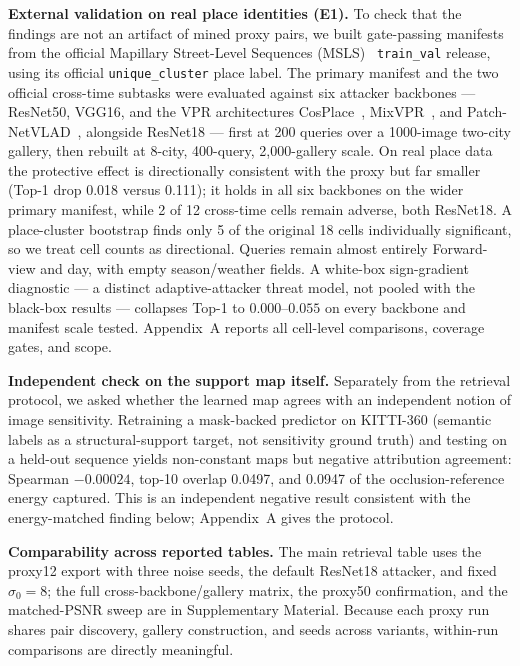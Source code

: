 \documentclass[10pt,journal]{IEEEtran}
\begin{document}
\textbf{External validation on real place identities (E1).} To check that the
findings are not an artifact of mined proxy pairs, we built gate-passing
manifests from the official Mapillary Street-Level Sequences
(MSLS)~\cite{mapillarymsls2020} \texttt{train\_val} release, using its
official \texttt{unique\_cluster} place label. The primary manifest and the
two official cross-time subtasks were evaluated against six attacker
backbones --- ResNet50, VGG16, and the VPR architectures
CosPlace~\cite{berton2022rethinking}, MixVPR~\cite{ali2023mixvpr}, and
Patch-NetVLAD~\cite{hausler2021patchnetvlad}, alongside ResNet18 --- first at
200 queries over a 1000-image two-city gallery, then rebuilt at 8-city,
400-query, 2,000-gallery scale. On real place data the protective effect is
directionally consistent with the proxy but far smaller (Top-1 drop 0.018
versus 0.111); it holds in all six backbones on the wider primary manifest,
while 2 of 12 cross-time cells remain adverse, both ResNet18. A place-cluster
bootstrap finds only 5 of the original 18 cells individually significant, so
we treat cell counts as directional. Queries remain almost entirely
Forward-view and day, with empty season/weather fields. A white-box
sign-gradient diagnostic --- a distinct adaptive-attacker threat model, not
pooled with the black-box results --- collapses Top-1 to $0.000$--$0.055$ on
every backbone and manifest scale tested. Appendix~A reports all cell-level
comparisons, coverage gates, and scope.

\textbf{Independent check on the support map itself.} Separately from the
retrieval protocol, we asked whether the learned map agrees with an
independent notion of image sensitivity. Retraining a mask-backed predictor on
KITTI-360 (semantic labels as a structural-support target, not sensitivity
ground truth) and testing on a held-out sequence yields non-constant maps but
negative attribution agreement: Spearman $-0.00024$, top-10 overlap 0.0497,
and 0.0947 of the occlusion-reference energy captured. This is an independent
negative result consistent with the energy-matched finding below; Appendix~A
gives the protocol.

\textbf{Comparability across reported tables.} The main retrieval table uses the proxy12 export with three noise seeds, the default ResNet18 attacker, and fixed $\sigma_0=8$; the full cross-backbone/gallery matrix, the proxy50 confirmation, and the matched-PSNR sweep are in Supplementary Material. Because each proxy run shares pair discovery, gallery construction, and seeds across variants, within-run comparisons are directly meaningful.
\end{document}
